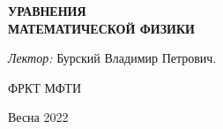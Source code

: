 \begin{titlepage}
    \begin{center}
        \vspace*{1cm}
        {\bf \Huge УРАВНЕНИЯ\\
        МАТЕМАТИЧЕСКОЙ 
        ФИЗИКИ}
        \vspace*{1cm}

        {\large \textit{Лектор:} Бурский Владимир Петрович.}

        \vfill

        ФРКТ МФТИ

        Весна 2022

        \vspace{1cm}
    \end{center}
\end{titlepage}
